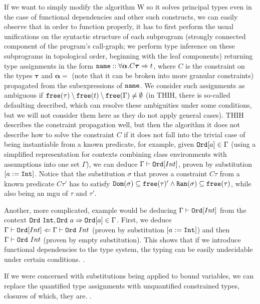 If we want to simply modify the algorithm W so it solves principal types even in the case of functional dependencies and other such constructs, we can easily observe that in order to function properly, it has to first perform the usual unifications on the syntactic structure of each subprogram (strongly connected component of the program's call-graph; we perform type inference on these subprograms in topological order, beginning with the leaf components) returning type assignments in the form $\mathtt{name} :: \forall \bm \alpha . C \bm \tau \Rightarrow t$, where $C$ is the constraint on the types $\bm \tau$ and $\bm \alpha = $ (note that it can be broken into more granular constraints) propagated from the subexpressions of $\mathtt{name}$. We consider such assignments as ambiguous if $\mathtt{free} (\tau) \setminus \mathtt{free} (t) \setminus \mathtt{free} (\Gamma) \neq \emptyset$ (in THIH, there is so-called defaulting described, which can resolve these ambiguities under some conditions, but we will not consider them here as they do not apply general cases). THIH describes the constraint propagation well, but then the algorithm it does not describe how to solve the constraint $C$ if it does not fall into the trivial case of being instantiable from a known predicate, for example, given $\mathtt{Ord} [a] \in \Gamma$ (using a simplified representation for contexts combining class environments with assumptions into one set $\Gamma$), we can deduce $\Gamma \vdash \mathtt{Ord} [Int]$, proven by substitution $[a := \mathtt{Int}]$. Notice that the substitution $\sigma$ that proves a constraint $C \tau$ from a known predicate $C \tau'$ has to satisfy $\mathtt{Dom} (\sigma) \subseteq \mathtt{free} (\tau)' \land \mathtt{Ran} (\sigma) \subseteq \mathtt{free} (\tau)$, while also being an mgu  of $\tau$ and $\tau'$.  

Another, more complicated, example would be deducing $\Gamma \vdash \mathtt{Ord} [Int]$ from the context $\mathtt{Ord}\ \mathtt{Int}, \mathtt{Ord}\ a \Rightarrow \mathtt{Ord} [a] \in \Gamma$. First, we deduce $\Gamma \vdash \mathtt{Ord} [Int] \Leftarrow \Gamma \vdash \mathtt{Ord}\ Int$ (proven by substitution $[a := \mathtt{Int}]$) and then $\Gamma \vdash \mathtt{Ord}\ Int$ (proven by empty substitution). This shows that if we introduce functional dependencies to the type system, the typing can be easily undecidable under certain conditions. .

If we were concerned with substitutions being applied to bound variables, we can replace the quantified type assignments with unquantified constrained types, closures of which, they are. .

